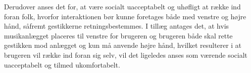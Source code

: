 Derudover anses det for, at være socialt uacceptabelt og uhøfligt at række ind foran folk, hvorfor interaktionen bør kunne foretages både med venstre og højre hånd, såfremt gestikkerne retningsbestemmes. I tillæg antages det, at hvis musikanlægget placeres til venstre for brugeren og brugeren både skal rette gestikken mod anlægget og kun må anvende højre hånd, hvilket resulterer i at brugeren vil række ind foran sig selv, vil det ligeledes anses som værende socialt uacceptabelt og tilmed ukomfortabelt. 